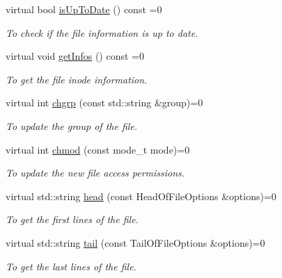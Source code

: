 \begin{DoxyCompactItemize}
virtual bool \hyperlink{classFileProxy_afae6e6254e95a89c0629d80136e3cc29}{isUpToDate} () const =0
\begin{DoxyCompactList}\small\item\em To check if the file information is up to date. \item\end{DoxyCompactList}\item 
\hypertarget{classFileProxy_a0425fcd383cef778b3b17b732eb27c64}{
virtual void \hyperlink{classFileProxy_a0425fcd383cef778b3b17b732eb27c64}{getInfos} () const =0}
\label{classFileProxy_a0425fcd383cef778b3b17b732eb27c64}

\begin{DoxyCompactList}\small\item\em To get the file inode information. \item\end{DoxyCompactList}\item 
virtual int \hyperlink{classFileProxy_ab2917ca9b79dd0eb7ab1c26d70e70987}{chgrp} (const std::string \&group)=0
\begin{DoxyCompactList}\small\item\em To update the group of the file. \item\end{DoxyCompactList}\item 
virtual int \hyperlink{classFileProxy_aff09861e6910e2d2d11c6971426cbf84}{chmod} (const mode\_\-t mode)=0
\begin{DoxyCompactList}\small\item\em To update the new file access permissions. \item\end{DoxyCompactList}\item 
virtual std::string \hyperlink{classFileProxy_ab17f4181ff6209f1e45de5d51bb0a3e1}{head} (const HeadOfFileOptions \&options)=0
\begin{DoxyCompactList}\small\item\em To get the first lines of the file. \item\end{DoxyCompactList}\item 
virtual std::string \hyperlink{classFileProxy_a95ac84bd106d6699252bf558ec4b4b71}{tail} (const TailOfFileOptions \&options)=0
\begin{DoxyCompactList}\small\item\em To get the last lines of the file. \item\end{DoxyCompactList}\item 

\end{DoxyCompactItemize}
